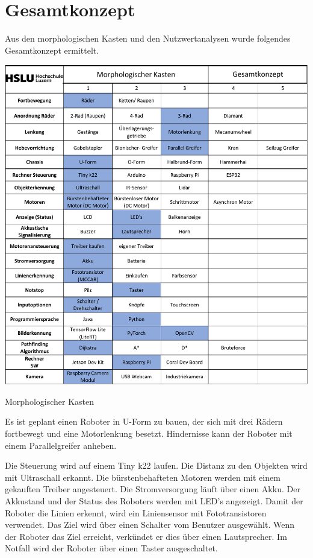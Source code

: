 \section{Gesamtkonzept}

Aus den morphologischen Kasten und den Nutzwertanalysen wurde folgendes Gesamtkonzept ermittelt. 

\begin{table}[H]
\centering
\includegraphics[width=\textwidth -40mm]{assets/MK-all.pdf}
\caption{Morphologischer Kasten}
\label{table:mk-all}
\end{table}

Es ist geplant einen Roboter in U-Form zu bauen, der sich mit drei Rädern fortbewegt und eine Motorlenkung besetzt. Hindernisse kann der Roboter mit einem Parallelgreifer anheben.

Die Steuerung wird auf einem Tiny k22 laufen. Die Distanz zu den Objekten wird mit Ultraschall erkannt. Die bürstenbehafteten Motoren werden mit einem gekauften Treiber angesteuert. Die Stromversorgung läuft über einen Akku. Der Akkustand und der Status des Roboters werden mit LED's angezeigt. Damit der Roboter die Linien erkennt, wird ein Liniensensor mit Fototransistoren verwendet. Das Ziel wird über einen Schalter vom Benutzer ausgewählt.
Wenn der Roboter das Ziel erreicht, verkündet er dies über einen Lautsprecher. Im Notfall wird der Roboter über einen Taster ausgeschaltet.

